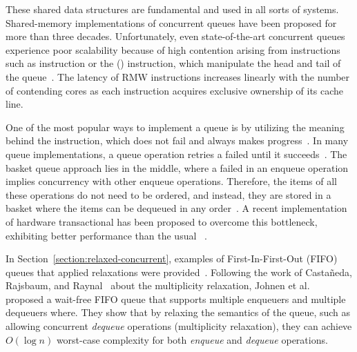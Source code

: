 These shared data structures are fundamental and used in all sorts of systems. Shared-memory implementations of concurrent queues have been proposed for more than three decades. Unfortunately, even state-of-the-art concurrent queues experience poor scalability because of high contention arising from \RMW{} instructions such as \CAS{} instruction or the (\FAI) instruction, which manipulate the head and tail of the queue~\cite{DBLP_conf_spaa_FatourouK11, DBLP_conf_ppopp_FatourouK12, basketqueue2007, DBLP_conf_ppopp_KoganP11, DBLP_journals_dc_Ladan-MozesS08, DBLP_conf_podc_MichaelS96, DBLP_journals_topc_Milman-SelaKLLP22, DBLP_conf_ppopp_YangM16}. The latency of RMW instructions increases linearly with the number of contending cores as each instruction acquires exclusive ownership of its cache line.

One of the most popular ways to implement a queue is by utilizing the meaning behind the \FAI{} instruction, which does not fail and always makes progress~\cite{ppopp2013x86queues, DBLP_conf_ppopp_YangM16}. In many queue implementations, a queue operation retries a failed \CAS{} until it succeeds~\cite{DBLP_conf_spaa_FatourouK11, DBLP_conf_ppopp_FatourouK12, basketqueue2007, DBLP_conf_ppopp_KoganP11, DBLP_journals_dc_Ladan-MozesS08, DBLP_conf_ppopp_YangM16}. The basket queue approach lies in the middle, where a failed \CAS{} in an enqueue operation implies concurrency with other enqueue operations. Therefore, the items of all these operations do not need to be ordered, and instead, they are stored in a basket where the items can be dequeued in any order~\cite{basketqueue2007}. A recent implementation of hardware transactional \CAS{} has been proposed to overcome this bottleneck, exhibiting better performance than the usual \CAS~\cite{scalingconcurrent2020}.

In Section~\ref{section:relaxed-concurrent}, examples of First-In-First-Out (FIFO) queues that applied relaxations were provided~\cite{DBLP_conf_cf_HaasLHPSKS13, DBLP_conf_pact_KirschLP13, DBLP_conf_ica3pp_KirschPRS12}. Following the work of Castañeda, Rajsbaum, and Raynal~\cite{DBLP_conf_opodis_CastanedaRR20} about the multiplicity relaxation, Johnen et al.~\cite{DBLP_conf_opodis_JohnenKM22} proposed a wait-free FIFO queue that supports multiple enqueuers and multiple dequeuers where. They show that by relaxing the semantics of the queue, such as allowing concurrent \emph{dequeue} operations (multiplicity relaxation), they can achieve \(O(\log{n})\) worst-case complexity for both \emph{enqueue} and \emph{dequeue} operations.

